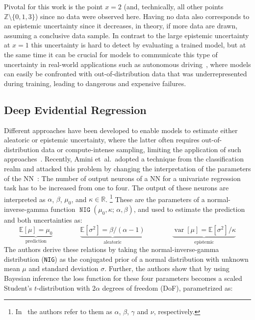 \documentclass{article}
\begin{document}
Pivotal for this work is the point $x=2$ (and, technically, all other points $\mathbb{Z} \setminus \{0, 1, 3\}$) since no data were observed here.
Having no data also corresponds to an epistemic uncertainty since it decreases, in theory, if more data are drawn, assuming a conclusive data sample.
In contrast to the large epistemic uncertainty at $x=1$ this uncertainty is hard to detect by evaluating a trained model, but at the same time it can be crucial for models to communicate this type of uncertainty in real-world applications such as autonomous driving~\cite{geiger12,bojarski16,godard17}, where models can easily be confronted with out-of-distribution data that was underrepresented during training, leading to dangerous and expensive failures.

\subsection{Deep Evidential Regression}
Different approaches have been developed to enable models to estimate either aleatoric or epistemic uncertainty, where the latter often requires out-of-distribution data or compute-intense sampling, limiting the application of such approaches~\cite{malinin18,gal16,lakshminarayanan17,jain21}.
Recently, Amini et~al.\ adopted a technique from the classification realm and attacked this problem by changing the interpretation of the parameters of the NN~\cite{amini20,sensoy18}:
The number of output neurons of a NN for a univariate regression task has to be increased from one to four.
The output of these neurons are interpreted as $\alpha$, $\beta$, $\mu_0$, and $\kappa \in \mathbb{R}$.%
\footnote{In~\cite{amini20} the authors refer to them as $\alpha$, $\beta$, $\gamma$ and $\nu$, respectively.}
These are the parameters of a normal-inverse-gamma function $\operatorname{\texttt{NIG}}(\mu_0, \kappa;\, \alpha, \beta)$, and used to estimate the prediction and both uncertainties as:
\begin{equation}
    \label{eq:uncs}
    \underbrace{\mathbb{E}[\mu] = \mu_0}_{\text{prediction}}
    \qquad\qquad
    \underbrace{\mathbb{E}[\sigma^2] = \beta / (\alpha - 1)}_{\text{aleatoric}}
    \qquad\qquad
    \underbrace{\operatorname{var}[\mu] = \mathbb{E}[\sigma^2] / \kappa}_{\text{epistemic}}
\end{equation}
The authors derive these relations by taking the normal-inverse-gamma distribution (\texttt{NIG}) as the conjugated prior of a normal distribution with unknown mean $\mu$ and standard deviation $\sigma$.
Further, the authors show that by using Bayesian inference the loss function for these four parameters becomes a scaled Student's $t$-distribution with $2\alpha$ degrees of freedom (DoF), parametrized as:
\end{document}

